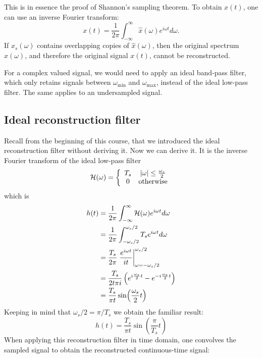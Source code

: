 This is in essence the proof of Shannon's sampling theorem. To obtain $x(t)$, one can use an inverse Fourier transform:
\begin{equation}
x(t) = \frac{1}{2\pi}\int_{-\infty}^{\infty} \hat{x}(\omega) e^{i\omega t}d\omega.
\end{equation}
If $\hat{x}_s(\omega)$ contains overlapping copies of $\hat{x}(\omega)$, then the original spectrum $\hat{x}(\omega)$, and therefore the original signal $x(t)$, cannot be reconstructed.

For a complex valued signal, we would need to apply an ideal band-pass filter, which only retains signals between $\omega_{\mathrm{min}}$ and
$\omega_{\mathrm{max}}$, instead of the ideal low-pass filter. The same applies to an undersampled signal.

\subsection{Ideal reconstruction filter}
Recall from the beginning of this course, that we introduced the ideal reconstruction filter without deriving it. Now we can derive it. It is the inverse Fourier transform of the ideal low-pass filter
\begin{equation}
\mathcal{H}(\omega) = \left\{ \begin{array}{cc}
T_s & |\omega| \le \frac{\omega_s}{2} \\
0 & \mathrm{otherwise}
\end{array}
\right.
\end{equation}
which is
\begin{align}
h(t) &= \frac{1}{2\pi}\int_{-\infty}^{\infty} \mathcal{H}(\omega) e^{i\omega t}d\omega \\
 &= \frac{1}{2\pi} \int_{-\omega_s/2}^{\omega_s/2} T_s e^{i\omega t}d\omega \\
 &= \frac{T_s}{2 \pi}\left. \frac{e^{i\omega t}}{it} \right|_{\omega=-\omega_s/2}^{\omega_s/2} \\
  &= \frac{T_s}{2 t \pi i}\left( e^{i\frac{\omega_s}{2} t}  - e^{-i\frac{\omega_s}{2} t} \right) \\
  &= \frac{T_s}{\pi t} \sin(\frac{\omega_s}{2}t) \\
\end{align}
Keeping in mind that $\omega_s/2 = \pi/T_s$ we obtain the familiar result:
\begin{equation}
\boxed{
h(t) = \frac{T_s}{\pi t}\sin(\frac{\pi}{T_s}t)
}
\end{equation}
When applying this reconstruction filter in time domain, one convolves the sampled signal to obtain the reconstructed continuous-time signal:
